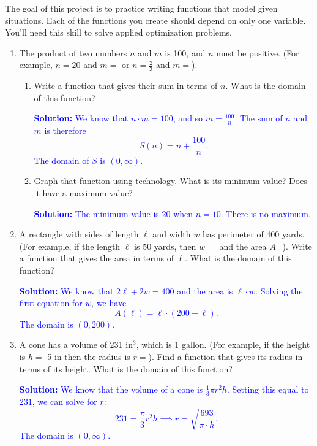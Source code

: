 \documentclass[letterpaper,11pt]{article}
\newcommand{\sol}[2]{\begin{minipage}[c][#1]{\linewidth}{\textcolor{blue}{\textbf{Solution:}}\quad \textcolor{blue}{#2}}\end{minipage}}
\newcommand{\ans}[1]{\underbar{\qquad \textcolor{red}{#1} \qquad}}
\newcommand{\sol}[2]{\begin{minipage}[c][#1]{\linewidth}{\vfill}\end{minipage}}
\newcommand{\ans}[1]{\underbar{\qquad \textcolor{white}{#1} \qquad}}
\begin{document}

The goal of this project is to practice writing functions that model given situations.  Each of the functions you create should depend on only one variable.  You'll need this skill to solve applied optimization problems.

\begin{enumerate}

\item The product of two numbers $n$ and $m$ is 100, and $n$ must be positive.  (For example, $n = 20$ and $m=$\ans{5} or $n=\frac{2}{3}$ and $m=$\ans{150}).  
\begin{enumerate}
\item Write a function that gives their sum in terms of $n$.  What is the domain of this function?

\sol{2 in}{
	We know that $n\cdot m=100$, and so $m=\frac{100}{n}$.
	The sum of $n$ and $m$ is therefore
	\[S(n) = n + \frac{100}{n}.\]
	The domain of $S$ is $(0,\infty)$.
}
\item  Graph that function using technology.  What is its minimum value?  Does it have a maximum value?

\sol{1.5in}{
	The minimum value is 20 when $n=10$.
	There is no maximum.
}
\end{enumerate}

\item  A rectangle with sides of length $\ell$ and width $w$ has perimeter of 400 yards. (For example, if the length $\ell$ is 50 yards, then $w=$\ans{150 \text{yards}} and the area $A$=\ans{7500 yards}).  Write a function that gives the area in terms of $\ell$.  What is the domain of this function?

\sol{2in}{
	We know that $2\ell+2w=400$ and the area is $\ell\cdot w$.
	Solving the first equation for $w$, we have
	\[A(\ell)=\ell\cdot (200-\ell).\]
	The domain is $(0,200)$.
}

\newpage
\item  A cone has a volume of 231 $\text{in}^3$, which is 1 gallon. (For example, if the height is $h=$ 5 in then the radius is $r=$\ans{6.64 in}).  Find a function that gives its radius in terms of its height.  What is the domain of this function?

\sol{3in}{
	We know that the volume of a cone is $\frac{1}{3}\pi r^2h$.
	Setting this equal to $231$, we can solve for $r$:
	\[231 = \frac{\pi}{3}r^2h\implies r=\sqrt{\frac{693}{\pi\cdot h}}.\]
	The domain is $(0,\infty)$.
}


\end{enumerate}
\end{document}
